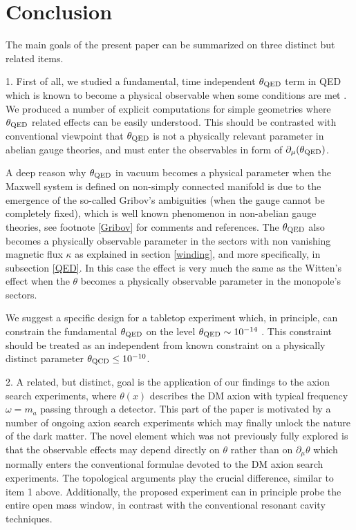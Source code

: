 \documentclass[ twocolumn,aps,prd,   
               preprintnumbers,numbers,sort&compress,nofootinbib,
                            showpacs,superscriptaddress,
               colorlinks,
               linkcolor=blue,   
               citecolor=blue]{revtex4-1}   \newcommand{\exclude}[1]{}
\begin{document}
            \section{Conclusion}\label{conclusion}
            The main goals of the present paper   can be summarized on three  distinct but related items.
            
   1.         First of all, we studied a  fundamental,  time independent $\theta_{\rm QED}$ term in QED which is known to become  a physical observable when  some conditions are met  \cite{Witten:1995gf,Verlinde:1995mz,Olive:2000yy}.  We produced a number of explicit computations for simple geometries where  $\theta_{\rm QED}$ related effects can be easily understood.   This should be   contrasted with conventional viewpoint that $\theta_{\rm QED}$  is not a physically relevant parameter in abelian gauge theories, and must enter the  observables in form of $\partial_{\mu}(\theta_{\rm QED})$.
   
    A deep reason why $\theta_{\rm QED}$ in vacuum becomes a physical parameter when the Maxwell  system is defined on non-simply connected manifold is due to the  emergence of the so-called Gribov's ambiguities (when the gauge cannot be completely fixed), which is well known phenomenon in non-abelian gauge theories,  see footnote \ref{Gribov} for comments and  references. The $\theta_{\rm QED}$ also becomes a physically observable parameter in the sectors with non vanishing  magnetic flux  $\kappa$  as explained in section \ref{winding}, and more specifically, in subsection \ref{QED}. In this case the effect is very much the same as the Witten's effect 
   when the $\theta$ becomes a physically observable parameter in the monopole's sectors. 
      
   We suggest a specific design for a tabletop experiment  which, in principle,  can constrain the fundamental $\theta_{\rm QED}$ on the level $\theta_{\rm QED}\sim 10^{-14}$ .  This constraint should be treated as an independent  from known constraint on a physically  distinct  parameter $\theta_{\rm QCD}\leq 10^{-10}$.  
 
   2. A related, but distinct, goal is the application of our findings  to the axion search experiments, where $\theta(x)$ describes the DM axion with typical frequency 
            $\omega=m_a$ passing through a detector.  This part of the paper  is motivated by a number of  ongoing axion search experiments which may finally unlock the nature of the dark matter.    The novel element which was not previously fully explored is that 
            the observable effects   may depend directly on $\theta$ rather than on $\partial_{\mu}\theta$ which normally enters the conventional formulae devoted to the DM axion search experiments. The topological arguments play the crucial difference, similar to item 1 above.  Additionally, the proposed experiment can in principle probe the entire open mass window, in contrast with the conventional resonant cavity techniques.
            
\end{document}
